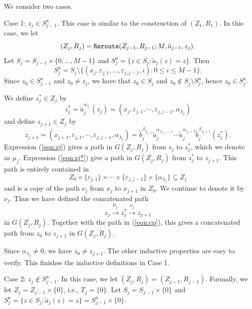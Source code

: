 \documentclass[11pt]{amsart}
\theoremstyle{definition}
\theoremstyle{definition}
\numberwithin{equation}{section}
\begin{document}
We consider two cases.

Case 1: $z_j\in S_{j-1}^a$. This case is similar to the construction of $(Z_1, R_1)$. In this case, we let
$$ (Z_j, R_j)=\mbox{\tt Reroute}(Z_{j-1}, R_{j-1}; M, \tilde{a}_{j-1}, z_j). $$
Let $S_j=S_{j-1}\times\{0, \dots, M-1\}$ and $S_j^a=\{z\in S_j\colon \tilde{a}_j(z)=z\}$. Then
$$ S_j^a=S_j\setminus \{(x_j, \varepsilon_{j,1}, \dots, \varepsilon_{j,j-1}, i)\colon 0\leq i\leq M-1\}. $$
Since $z_0\in S_{j-1}^a$ and $z_0\neq z_j$, we have that $z_0\in S_j$ and $z_0\not\in S_j\setminus S_j^a$, hence $z_0\in S_j^a$.

We define $z_j^*\in Z_j$ by
\begin{equation}\label{eqn:zj} z_j^*=\tilde{a}_j^{\alpha_{\lambda_j}}(z_j)=(x_j, \varepsilon_{j,1}, \cdots, \varepsilon_{j, j-1}, \alpha_{\lambda_j}) \end{equation}
and define $z_{j+1}\in Z_{j}$ by
\begin{equation}\label{eqn:zj*} z_{j+1}=(x_{j+1}, \varepsilon_{j,1}, \cdots, \varepsilon_{j,j-1}, \alpha_{\lambda_j})=\tilde{b}_j^{\beta_{\lambda_{j+1}}}\tilde{a}_j^{\alpha_{\lambda_{j+1}-1}}\cdots\tilde{a}_j^{\alpha_{\lambda_{j}+1}}\tilde{b}_j^{\beta_{\lambda_{j}+1}}(z_j^*). \end{equation}
Expression (\ref{eqn:zj}) gives a path in $G(Z_j, R_j)$ from $z_j$ to $z_j^*$, which we denote as $\mu_j$. Expression (\ref{eqn:zj*}) give a path in $G(Z_j, R_j)$ from $z_j^*$ to $z_{j+1}$. This path is entirely contained in 
$$Z_0\times  \{\varepsilon_{j,1}\}\times \cdots\times\{ \varepsilon_{j,j-1}\}\times\{\alpha_{\lambda_j}\}\subseteq Z_{j}$$
and is a copy of the path $\nu_j$ from $x_j$ to $x_{j+1}$ in $Z_0$. We continue to denote it by $\nu_j$. Thus we have defined the concatenated path
$$ z_j\stackrel{\mu_j}{\longrightarrow} z_j^*\stackrel{\nu_j}{\longrightarrow} z_{j+1} $$
in $G(Z_j, R_j)$. Together with the path in (\ref{eqn:cp}), this gives a concatenated path from $z_0$ to $z_{j+1}$ in $G(Z_j, R_j)$. 

Since $\alpha_{\lambda_j}\neq 0$, we have $z_0\neq z_{j+1}$. The other inductive properties are easy to verify. This finishes the inductive definitions in Case 1.









Case 2: $z_j\not\in S_{j-1}^a$. In this case, we let $(Z_j, R_j)=(Z_{j-1}, R_{j-1})$. Formally, we let $Z_j=Z_{j-1}\times\{0\}$, i.e., $T_j=\{0\}$. Let $S_j=S_{j-1}\times \{0\}$ and $S_j^a=\{z\in S_j\colon \tilde{a}_j(z)=z\}=S_{j-1}^a\times\{0\}$.
\end{document}
